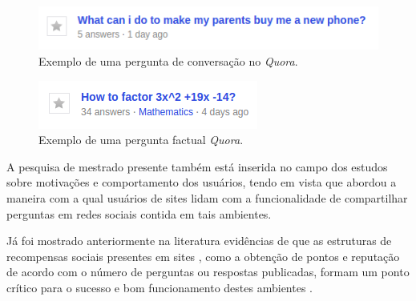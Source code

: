     \begin{figure}[H]
        \center
        \includegraphics[scale=.8]{./figuras/conversa.png}
        \caption{Exemplo de uma pergunta de conversação no \textit{Quora}.}
        \label{fig:conversa}
    \end{figure}
    
    \begin{figure}[H]
        \center
        \includegraphics[scale=.8]{./figuras/factual.png}
        \caption{Exemplo de uma pergunta factual \textit{Quora}.}
        \label{fig:factual}
    \end{figure}





A pesquisa de mestrado presente também está inserida no campo dos estudos sobre motivações e comportamento dos usuários, tendo em vista que abordou a maneira com a qual usuários de sites \qa lidam com a funcionalidade de compartilhar perguntas em redes sociais contida em tais ambientes.

Já foi mostrado anteriormente na literatura evidências de que as estruturas de recompensas sociais presentes em sites \qanospace, como a obtenção de pontos e reputação de acordo com o número de perguntas ou respostas publicadas, formam um ponto crítico para o sucesso e bom funcionamento destes ambientes \cite{shah2008exploring}. 

